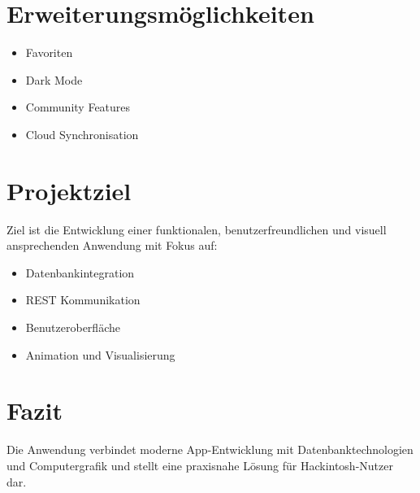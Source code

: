 \documentclass[a4paper,12pt]{article}
\begin{document}
\section{Erweiterungsmöglichkeiten}
\begin{itemize}
\item Favoriten
\item Dark Mode
\item Community Features
\item Cloud Synchronisation
\end{itemize}

\section{Projektziel}
Ziel ist die Entwicklung einer funktionalen, benutzerfreundlichen und visuell ansprechenden Anwendung mit Fokus auf:

\begin{itemize}
\item Datenbankintegration
\item REST Kommunikation
\item Benutzeroberfläche
\item Animation und Visualisierung
\end{itemize}

\section{Fazit}
Die Anwendung verbindet moderne App-Entwicklung mit Datenbanktechnologien und Computergrafik und stellt eine praxisnahe Lösung für Hackintosh-Nutzer dar.
\end{document}
